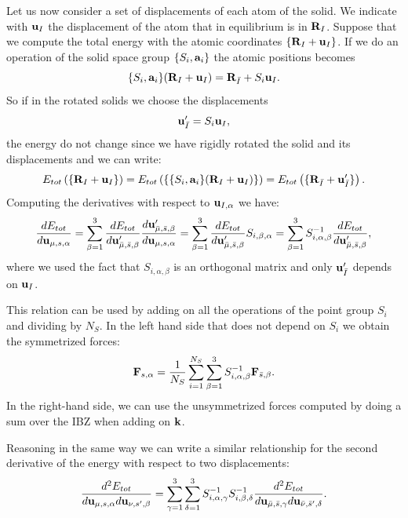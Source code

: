 \documentclass[12pt,a4paper,twoside]{report}
\begin{document}
Let us now consider a set of displacements of each atom of the solid. We indicate with ${\bf u}_{I}$ the displacement of the atom that in equilibrium is in
${\bf R}_I$. Suppose that we compute the total energy
with the atomic coordinates $\{{\bf R}_I + {\bf u}_I\}$.
If we do an operation of the solid space group
$\{S_i,{\bf a}_i\}$ the atomic positions becomes
\begin{equation}
\{S_i,{\bf a}_i\} ({\bf R}_I + {\bf u}_I) = 
{\bf R}_{\bar I} + S_i {\bf u}_I.
\end{equation}
So if in the rotated solids we choose the displacements
\begin{equation}
{\bf u}'_{\bar I} =  S_i {\bf u}_I,
\label{rotated_disp}
\end{equation}
the energy do not change since we have rigidly rotated the solid and its
displacements and we can write:
\begin{equation}
E_{tot}\left(\{{\bf R}_I + {\bf u}_I\}\right) = E_{tot}\left (\{\{S_i,{\bf a}_i\} ({\bf R}_I + {\bf u}_I)\}\right )=
E_{tot}\left(\{ {\bf R}_{\bar I} + {\bf u}'_{\bar I}\}\right).
\end{equation}
Computing the derivatives with respect to ${\bf u}_{I,\alpha}$ we have:
\begin{equation}
{d E_{tot} \over d {\bf u}_{\mu,s,\alpha}} = \sum_{\beta=1}^3
{d E_{tot} \over d {\bf u}'_{{\bar \mu},{\bar s},\beta}} 
{d {\bf u}'_{{\bar \mu},{\bar s},\beta} \over
d {\bf u}_{\mu, s,\alpha}}=\sum_{\beta=1}^3
{d E_{tot} \over d {\bf u}'_{{\bar \mu},{\bar s},\beta}} 
S_{i,\beta,\alpha}=\sum_{\beta=1}^3 S^{-1}_{i,\alpha,\beta}
{d E_{tot} \over d {\bf u}'_{{\bar \mu},{\bar s},\beta}},
\end{equation}
where we used the fact that $S_{i,\alpha,\beta}$ is an orthogonal matrix and
only ${\bf u}'_{\bar I}$ depends on ${\bf u}_{I}$.

This relation can be used by adding on all the operations of the point group $S_i$ and dividing by
$N_S$. In the left hand side that does not depend on
$S_i$ we obtain the symmetrized forces:
\begin{equation}
{\bf F}_{s,\alpha} ={1 \over N_S} \sum_{i=1}^{N_S} \sum_{\beta=1}^3 S^{-1}_{i,\alpha,\beta}
{\bf F}_{\bar s,\beta}.
\label{symforce}
\end{equation}
In the right-hand side, we can use the unsymmetrized
forces computed by doing a sum over the IBZ when
adding on ${\bf k}$.

Reasoning in the same way we can write a similar relationship for the second derivative of the energy with respect to two displacements:
\begin{equation}
{d^2 E_{tot} \over d {\bf u}_{\mu,s,\alpha} d {\bf u}_{\nu,s',\beta}} =
\sum_{\gamma=1}^3\sum_{\delta=1}^3  S^{-1}_{i,\alpha,\gamma} S^{-1}_{i,\beta,\delta}
{d^2 E_{tot} \over d {\bf u}_{{\bar \mu},{\bar s},\gamma}d {\bf u}_{{\bar \nu},{\bar s}',\delta} }.
\label{secondder}
\end{equation}
\end{document}
